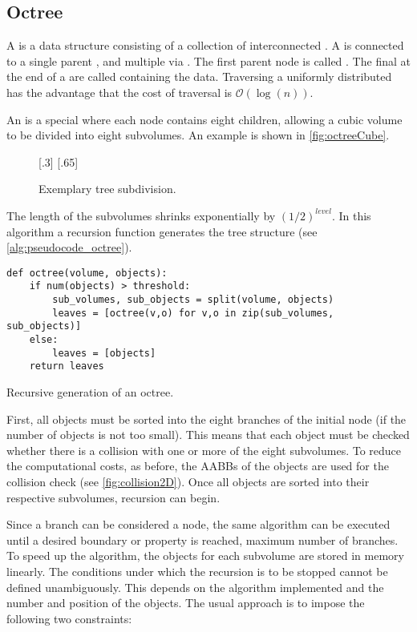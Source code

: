 \subsection{Octree}\label{sec:octree}
%
A  is a data structure consisting of a collection of interconnected  .
A  is connected to a single parent , and multiple  via .
The first parent node is called .
The final  at the end of a  are called  containing the data.
Traversing a uniformly distributed  has the advantage that the cost of traversal is $\mathcal{O}(\log(n))$.
\par
%
An  is a special  where each node contains eight children, allowing a cubic volume to be divided into eight subvolumes.
An example is shown in \cref{fig:octreeCube}.
%
\begin{figure}[!t]
    \centering
    [.3\textwidth]{
    \def\tikzheight{0.6\textwidth}
    }
    \hfill
    [.65\textwidth]{
    \def\tikzheight{0.6\textwidth}
    }
	\caption[]{Exemplary tree subdivision.}
	\label{fig:octree}
\end{figure}
%
The length of the subvolumes shrinks exponentially by $(1/2)^\mathit{level}$.
In this algorithm a recursion function  generates the tree structure (see \cref{alg:pseudocode_octree}).
\par
%
\begin{lstfloat}[!tb]
\lstset{style=python}
\begin{lstlisting}[]
def octree(volume, objects):
    if num(objects) > threshold:
        sub_volumes, sub_objects = split(volume, objects)
        leaves = [octree(v,o) for v,o in zip(sub_volumes, sub_objects)]
    else:
        leaves = [objects]
    return leaves
\end{lstlisting}
\caption[]{Recursive generation of an octree.}
\label{alg:pseudocode_octree}
\end{lstfloat}
%
First, all objects must be sorted into the eight branches of the initial node (if the number of objects is not too small). This means that each object must be checked whether there is a collision with one or more of the eight subvolumes.
To reduce the computational costs, as before, the \acp{AABB} of the objects are used for the collision check (see \cref{fig:collision2D}).
Once all objects are sorted into their respective subvolumes, recursion can begin.
\par
%
Since a branch can be considered a node, the same algorithm can be executed until a desired boundary or property is reached, \eg{} maximum number of branches.
To speed up the algorithm, the objects for each subvolume are stored in memory linearly.
The conditions under which the recursion is to be stopped cannot be defined unambiguously.
This depends on the algorithm implemented and the number and position of the objects.
The usual approach is to impose the following two constraints:
%
